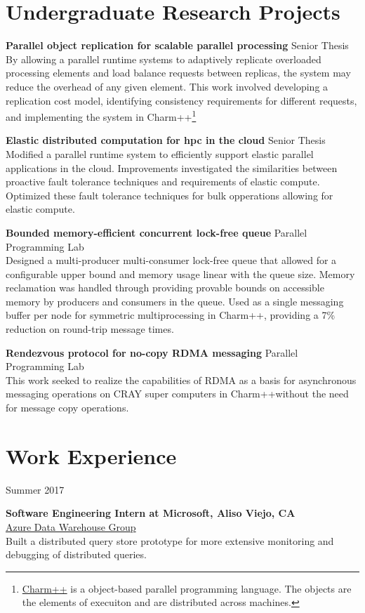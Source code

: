\documentclass[10pt]{article}
\newcommand{\leftrightrow}[2]{
	#1 \hfill #2 \\
}
\newcommand{\workblock}[4]{
\begin{minipage}[t]{0.14\textwidth}
\vspace*{0.4em}
\begin{flushright}#3\end{flushright}
\end{minipage}
\hfill\vline\hfill
\begin{minipage}[t]{0.82\textwidth}
\vspace*{0.4em}
	\textbf{#1} \\
	#2 \\
    #4
\end{minipage}
\vspace{0.7em}
}
\newcommand{\researchblock}[3]{
	\leftrightrow{\textbf{#1}}{#2}#3
}
\begin{document}
\section{Undergraduate Research Projects}
\vspace{0.1em}
\researchblock{Parallel object replication for scalable parallel processing}{Senior Thesis}
{
	By allowing a parallel runtime systems to adaptively replicate overloaded processing elements and load balance requests between replicas, the system may reduce the overhead of any given element. This work involved developing a replication cost model, identifying consistency requirements for different requests, and
	implementing the system in Charm++\footnote[1]{
	\href{http://charm.cs.illinois.edu/research/charm}{Charm++} is a object-based parallel programming language. The objects are the elements of execuiton and are distributed across machines.}
}

\vspace{0.6em}

\researchblock{Elastic distributed computation for hpc in the cloud}{Senior Thesis}
{
	Modified a parallel runtime system to efficiently support elastic parallel applications in the cloud. Improvements investigated the similarities between proactive fault tolerance techniques and requirements of elastic compute. Optimized these fault tolerance techniques for bulk opperations allowing for elastic compute.
}

\vspace{0.6em}

\researchblock{Bounded memory-efficient concurrent lock-free queue}{Parallel Programming Lab}
{
	Designed a multi-producer multi-consumer lock-free queue that allowed for a configurable upper bound and memory usage linear with the queue size. Memory reclamation was handled through providing provable bounds on accessible memory by producers and consumers in the queue. Used as a single messaging buffer per node for symmetric multiprocessing in Charm++\footnotemark[1], providing a 7\% reduction on round-trip message times.
}

\vspace{0.6em}

\researchblock{Rendezvous protocol for no-copy RDMA messaging}{Parallel Programming Lab}{
	This work seeked to realize the capabilities of RDMA as a basis for asynchronous messaging operations on CRAY super computers in Charm++\footnotemark[1] without the need for message copy operations. 
}

\section{Work Experience}
\vspace{-0.4em}
\workblock{Software Engineering Intern at Microsoft, Aliso Viejo, CA}{\href{https://azure.microsoft.com/en-us/services/sql-data-warehouse/}{Azure Data Warehouse Group}}{Summer 2017}{Built a distributed query store prototype for more extensive monitoring and debugging of distributed queries.} 
\end{document}
